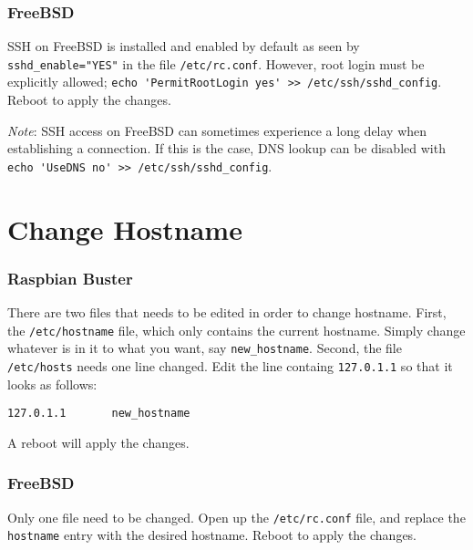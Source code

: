 \subsubsection{FreeBSD}

SSH on FreeBSD is installed and enabled by default as seen by \lstinline{sshd_enable="YES"} in the file \lstinline{/etc/rc.conf}. However, root login must be explicitly allowed; \lstinline{echo 'PermitRootLogin yes' >> /etc/ssh/sshd_config}. Reboot to apply the changes.

\textit{Note}: SSH access on FreeBSD can sometimes experience a long delay when establishing a connection. If this is the case, DNS lookup can be disabled with \lstinline{echo 'UseDNS no' >> /etc/ssh/sshd_config}.









\section{Change Hostname} \label{change_hostname}


\subsubsection{Raspbian Buster}

There are two files that needs to be edited in order to change hostname. First, the \lstinline{/etc/hostname} file, which only contains the current hostname. Simply change whatever is in it to what you want, say \lstinline{new_hostname}. Second, the file \lstinline{/etc/hosts} needs one line changed. Edit the line containg \lstinline{127.0.1.1} so that it looks as follows:

\begin{verbatim}
127.0.1.1       new_hostname
\end{verbatim}

A reboot will apply the changes.


\subsubsection{FreeBSD}

Only one file need to be changed. Open up the \lstinline{/etc/rc.conf} file, and replace the \lstinline{hostname} entry with the desired hostname. Reboot to apply the changes.










